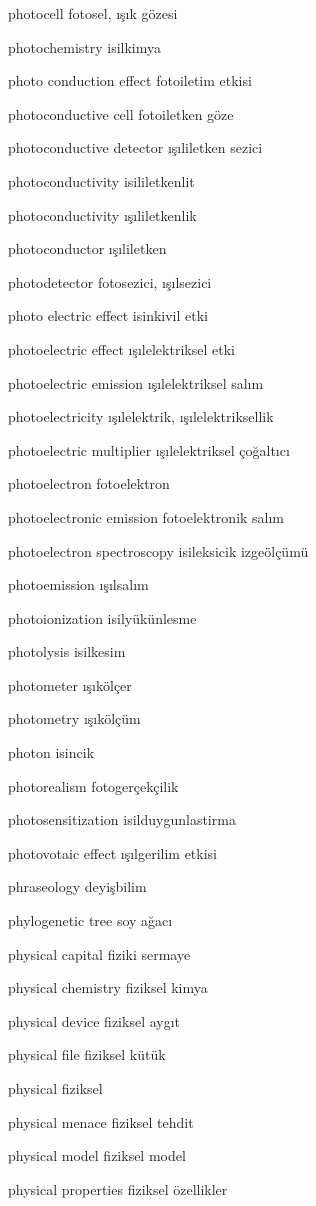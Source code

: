 \documentclass[12pt,fleqn]{article}\usepackage{../../common}
\begin{document}
photocell fotosel, ışık gözesi

photochemistry isilkimya

photo conduction effect fotoiletim etkisi

photoconductive cell fotoiletken göze

photoconductive detector ışıliletken sezici

photoconductivity isililetkenlit

photoconductivity ışıliletkenlik

photoconductor ışıliletken

photodetector fotosezici, ışılsezici

photo electric effect isinkivil etki

photoelectric effect ışılelektriksel etki

photoelectric emission ışılelektriksel salım

photoelectricity ışılelektrik, ışılelektriksellik

photoelectric multiplier ışılelektriksel çoğaltıcı

photoelectron fotoelektron

photoelectronic emission fotoelektronik salım

photoelectron spectroscopy isileksicik izgeölçümü

photoemission ışılsalım

photoionization isilyükünlesme

photolysis isilkesim

photometer ışıkölçer

photometry ışıkölçüm

photon isincik

photorealism fotogerçekçilik

photosensitization isilduygunlastirma

photovotaic effect ışılgerilim etkisi

phraseology deyişbilim

phylogenetic tree soy ağacı

physical capital fiziki sermaye

physical chemistry fiziksel kimya

physical device fiziksel aygıt

physical file fiziksel kütük

physical fiziksel

physical menace fiziksel tehdit

physical model fiziksel model

physical properties fiziksel özellikler
\end{document}
